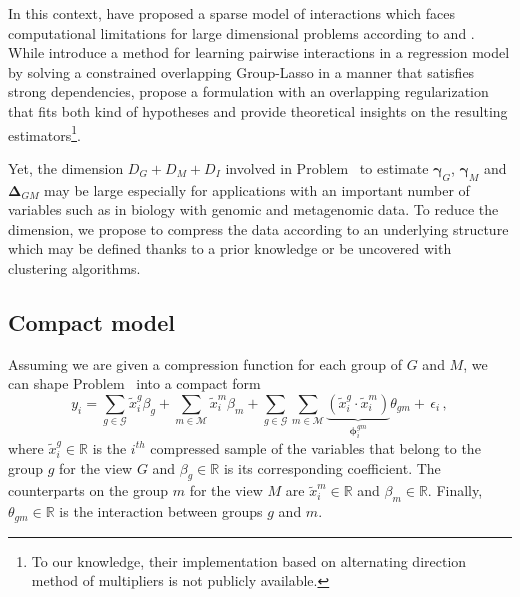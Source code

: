 \documentclass[]{book}
\begin{document}
In this context, \citep{bien2013lasso} have proposed a sparse model of
interactions which faces computational limitations for large dimensional
problems according to \citep{lim2015learning} and \citep{she2016group}. While
\citep{lim2015learning} introduce a method for learning pairwise interactions
in a regression model by solving a constrained overlapping Group-Lasso
\citep{jacob2009group} in a manner that satisfies strong dependencies,
\citep{she2016group} propose a formulation with an overlapping regularization
that fits both kind of hypotheses and provide theoretical insights on
the resulting estimators\footnote{To our knowledge, their implementation based on alternating
  direction method of multipliers is not publicly available.}.

Yet, the dimension \(D_{\mathit{G}} + D_{\mathit{M}} + D_I\) involved in Problem~ to
estimate \(\boldsymbol{\gamma}_{\mathit{G}}\), \(\boldsymbol{\gamma}_{\mathit{M}}\) and \(\boldsymbol{\Delta}_{\mathit{G}\mathit{M}}\) may be
large especially for applications with an important number of variables
such as in biology with genomic and metagenomic data. To reduce the
dimension, we propose to compress the data according to an underlying
structure which may be defined thanks to a prior knowledge or be
uncovered with clustering algorithms.

\hypertarget{compressdata}{%
\subsection{Compact model}\label{compressdata}}

Assuming we are given a compression function for each group of \(\mathit{G}\) and
\(\mathit{M}\), we can shape Problem~ into a compact form
\[\label{eq:compact_detailled_model}  
  y_i = 
  \sum_{g \in \mathcal{G}} \tilde{x}_i^g \beta_{g} +
  \sum_{m \in \mathcal{M}} \tilde{x}_i^m \beta_{m} +
  \sum_{g \in \mathcal{G}} \sum_{m \in \mathcal{M}}
  \underbrace{\left(\tilde{x}_i^g  \cdot
      \tilde{x}_i^m\right)}_{\boldsymbol{\phi}^{gm}_i}
  {\theta_{gm}} + \, \epsilon_i \,,\] where
\(\tilde{x}_i^g \in \mathbb{R}\) is the \(i^{th}\) compressed sample of the
variables that belong to the group \(g\) for the view \(\mathit{G}\) and
\(\beta_{g} \in \mathbb{R}\) is its corresponding coefficient. The
counterparts on the group \(m\) for the view \(\mathit{M}\) are
\(\tilde{x}_i^m \in \mathbb{R}\) and \(\beta_{m} \in \mathbb{R}\). Finally,
\(\theta_{gm} \in \mathbb{R}\) is the interaction between groups \(g\) and
\(m\).
\end{document}
